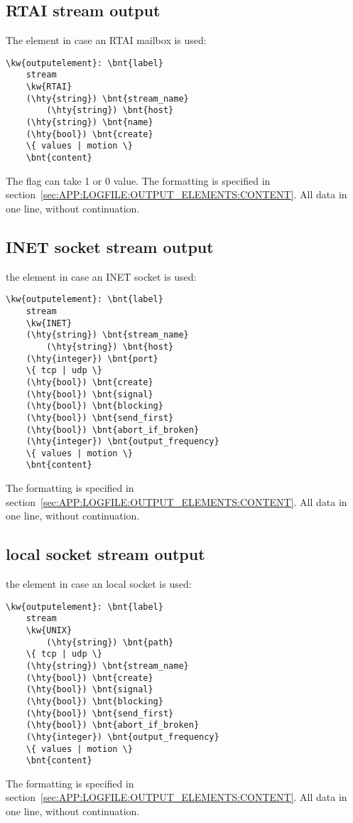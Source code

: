 \subsection{RTAI stream output}
The  element in case an RTAI mailbox is used:
\begin{Verbatim}[commandchars=\\\{\}]
\kw{outputelement}: \bnt{label}
	stream
	\kw{RTAI}
	(\hty{string}) \bnt{stream_name}
        (\hty{string}) \bnt{host}
	(\hty{string}) \bnt{name}
	(\hty{bool}) \bnt{create}
	\{ values | motion \}
	\bnt{content}
\end{Verbatim}
The  flag can take 1 or 0 value. The  formatting
is specified in section~\ref{sec:APP:LOGFILE:OUTPUT_ELEMENTS:CONTENT}.
All data in one line, without continuation.

\subsection{INET socket stream output}
the  element in case an INET socket is used:
\begin{Verbatim}[commandchars=\\\{\}]
\kw{outputelement}: \bnt{label}
	stream
	\kw{INET}
	(\hty{string}) \bnt{stream_name}
        (\hty{string}) \bnt{host}
	(\hty{integer}) \bnt{port}
	\{ tcp | udp \}
	(\hty{bool}) \bnt{create}
	(\hty{bool}) \bnt{signal}
	(\hty{bool}) \bnt{blocking}
	(\hty{bool}) \bnt{send_first}
	(\hty{bool}) \bnt{abort_if_broken}
	(\hty{integer}) \bnt{output_frequency}
	\{ values | motion \}
	\bnt{content}
\end{Verbatim}
The  formatting
is specified in section~\ref{sec:APP:LOGFILE:OUTPUT_ELEMENTS:CONTENT}.
All data in one line, without continuation.

\subsection{local socket stream output}
the  element in case an local socket is used:
\begin{Verbatim}[commandchars=\\\{\}]
\kw{outputelement}: \bnt{label}
	stream
	\kw{UNIX}
        (\hty{string}) \bnt{path}
	\{ tcp | udp \}
	(\hty{string}) \bnt{stream_name}
	(\hty{bool}) \bnt{create}
	(\hty{bool}) \bnt{signal}
	(\hty{bool}) \bnt{blocking}
	(\hty{bool}) \bnt{send_first}
	(\hty{bool}) \bnt{abort_if_broken}
	(\hty{integer}) \bnt{output_frequency}
	\{ values | motion \}
	\bnt{content}
\end{Verbatim}
The  formatting is specified in 
section~\ref{sec:APP:LOGFILE:OUTPUT_ELEMENTS:CONTENT}.
All data in one line, without continuation.

